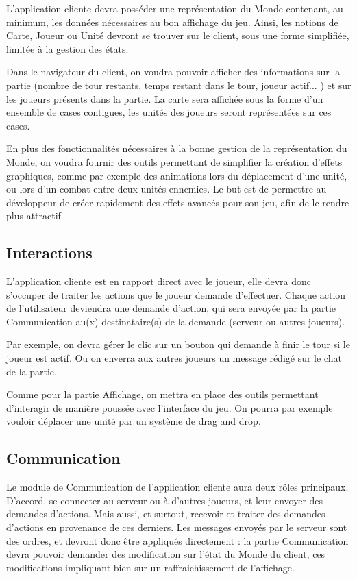 \documentclass[a4paper,10pt]{report}
\begin{document}
        L'application cliente devra posséder une représentation du Monde contenant, au minimum, les données nécessaires au bon affichage du jeu. Ainsi, les notions de Carte, Joueur ou Unité devront se trouver sur le client, sous une forme simplifiée, limitée à la gestion des états. 
        
        Dans le navigateur du client, on voudra pouvoir afficher des informations sur la partie (nombre de tour restants, temps restant dans le tour, joueur actif... ) et sur les joueurs présents dans la partie. La carte sera affichée sous la forme d'un ensemble de cases contigues, les unités des joueurs seront représentées sur ces cases. 
        
        En plus des fonctionnalités nécessaires à la bonne gestion de la représentation du Monde, on voudra fournir des outils permettant de simplifier la création d'effets graphiques, comme par exemple des animations lors du déplacement d'une unité, ou lors d'un combat entre deux unités ennemies. Le but est de permettre au développeur de créer rapidement des effets avancés pour son jeu, afin de le rendre plus attractif. 

      \subsection{Interactions}

        L'application cliente est en rapport direct avec le joueur, elle devra donc s'occuper de traiter les actions que le joueur demande d'effectuer. Chaque action de l'utilisateur deviendra une demande d'action, qui sera envoyée par la partie Communication au(x) destinataire(s) de la demande (serveur ou autres joueurs). 
        
        Par exemple, on devra gérer le clic sur un bouton qui demande à finir le tour si le joueur est actif. Ou on enverra aux autres joueurs un message rédigé sur le chat de la partie. 
        
        Comme pour la partie Affichage, on mettra en place des outils permettant d'interagir de manière poussée avec l'interface du jeu. On pourra par exemple vouloir déplacer une unité par un système de drag and drop. 

      \subsection{Communication}

        Le module de Communication de l'application cliente aura deux rôles principaux. D'accord, se connecter au serveur ou à d'autres joueurs, et leur envoyer des demandes d'actions. Mais aussi, et surtout, recevoir et traiter des demandes d'actions en provenance de ces derniers. Les messages envoyés par le serveur sont des ordres, et devront donc être appliqués directement : la partie Communication devra pouvoir demander des modification sur l'état du Monde du client, ces modifications impliquant bien sur un raffraichissement de l'affichage. 
\end{document}
